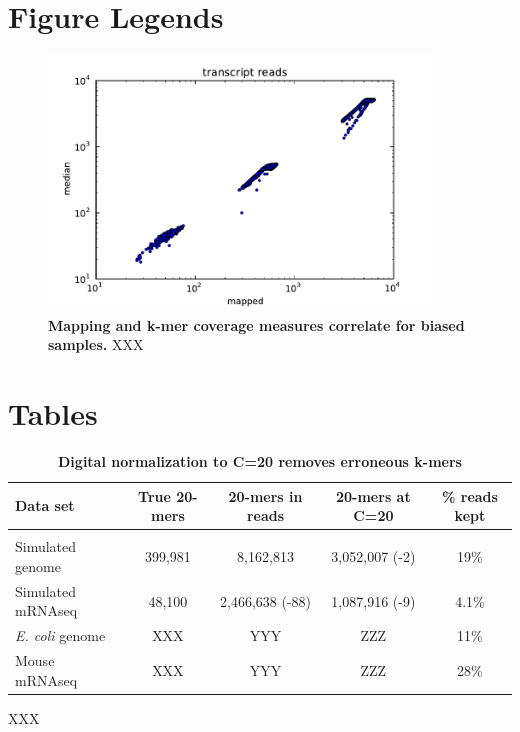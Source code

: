 \documentclass[10pt,draft]{article}
\begin{document}
\section*{Figure Legends}
\begin{figure}[!ht]
\begin{center}
\includegraphics[width=4in]{diginorm-fig2a.pdf}
\end{center}
\caption{
{\bf Mapping and k-mer coverage measures correlate for biased samples.}
XXX
}
\label{fig:transcripts}
\end{figure}

\section*{Tables}

\begin{table}[!ht]
\caption{
\bf{Digital normalization to C=20 removes erroneous k-mers}}
\begin{tabular}{|l|c|c|c|c|}
Data set & True 20-mers & 20-mers in reads & 20-mers at C=20 & \% reads kept\\
\hline \\
Simulated genome & 399,981 & 8,162,813 & 3,052,007 (-2) & 19\% \\
Simulated mRNAseq & 48,100 & 2,466,638 (-88) & 1,087,916 (-9) & 4.1\% \\
{\em E. coli} genome & XXX & YYY & ZZZ & 11\% \\
Mouse mRNAseq & XXX & YYY & ZZZ & 28\% \\
\end{tabular}
\begin{flushleft} XXX
\end{flushleft}
\label{tab:normC20}
\end{table}
\end{document}
